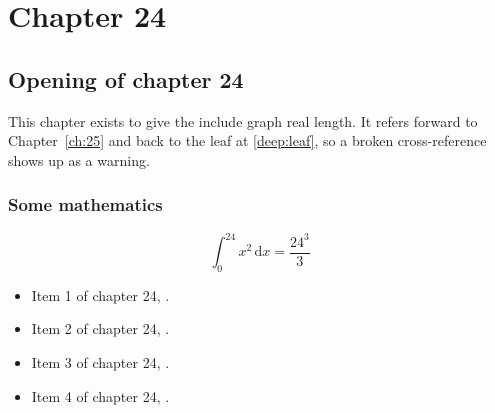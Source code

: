 \chapter{Chapter 24}
\label{ch:24}
\section{Opening of chapter 24}
This chapter exists to give the include graph real length. It refers
forward to Chapter~\ref{ch:25} and back to the leaf
at \ref{deep:leaf}, so a broken cross-reference shows up as a warning.

\subsection{Some mathematics}
\begin{equation}
  \int_0^{24} x^{2} \, \mathrm{d}x = \frac{24^{3}}{3}
\end{equation}

\begin{itemize}
  \item Item 1 of chapter 24, .
  \item Item 2 of chapter 24, .
  \item Item 3 of chapter 24, .
  \item Item 4 of chapter 24, .
\end{itemize}
